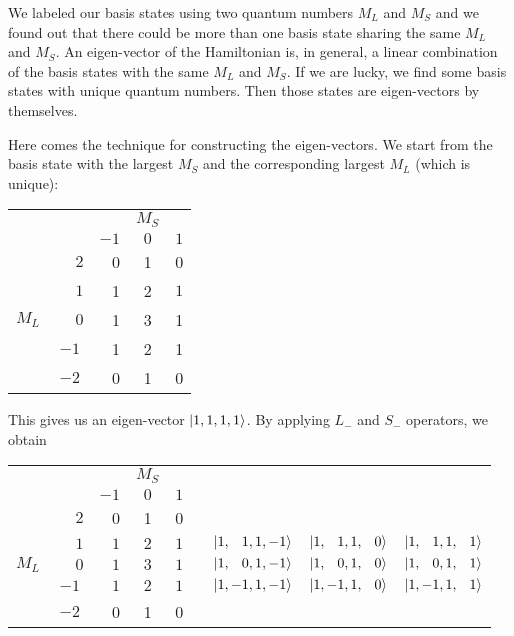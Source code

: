 We labeled our basis states using two quantum numbers $M_L$ and $M_S$ and we found out
that there could be more than one basis state sharing the same $M_L$ and $M_S$.
An eigen-vector of the Hamiltonian is, in general, a linear combination of the basis states
with the same $M_L$ and $M_S$. If we are lucky, we find some basis states with unique
quantum numbers. Then those states are eigen-vectors by themselves.

Here comes the technique for constructing the eigen-vectors.
We start from the basis state with the largest $M_S$ and the corresponding largest
$M_L$ (which is unique):
\begin{center}
\begin{tabular}{c c|r c c}
      &  &  & $M_S$ & \\
      &  & $-1$ & $0$ & $1$ \\ \hline
      & $\phantom{-}2$ & 0 & 1 & 0 \\
      & $\phantom{-}1$ & 1 & 2 & $\boxed{1}$ \\
$M_L$ & $\phantom{-}0$ & 1 & 3 & 1 \\
      & $-1$ & 1 & 2 & 1 \\
      & $-2$ & 0 & 1 & 0 \\
\end{tabular}
\end{center}

This gives us an eigen-vector $\Ket{1,1,1,1}$. By applying $L_-$ and $S_-$ operators,
we obtain 
\begin{center}
\begin{tabular}{c c|r c c r r r}
      &  &  & $M_S$ &  &  &  \\
      &  & $-1$ & $0$ & $1$ &  &  \\ \cline{1-5}
      & $\phantom{-}2$ & 0 & 1 & 0 &  &  &  \\
      & $\phantom{-}1$ & $\boxed{1}$ & $\boxed{2}$ & $\boxed{1}$ & $\quad\Ket{1,\phantom{-}1,1,-1}$ & $\Ket{1,\phantom{-}1,1,\phantom{-}0}$ & $\Ket{1,\phantom{-}1,1,\phantom{-}1}$ \\
$M_L$ & $\phantom{-}0$ & $\boxed{1}$ & $\boxed{3}$ & $\boxed{1}$ & $\quad\Ket{1,\phantom{-}0,1,-1}$ & $\Ket{1,\phantom{-}0,1,\phantom{-}0}$ & $\Ket{1,\phantom{-}0,1,\phantom{-}1}$ \\
      & $-1$ & $\boxed{1}$ & $\boxed{2}$ & $\boxed{1}$ & $\quad\Ket{1,-1,1,-1}$ & $\Ket{1,-1,1,\phantom{-}0}$ & $\Ket{1,-1,1,\phantom{-}1}$ \\
      & $-2$ & 0 & 1 & 0 &  &  &  \\
\end{tabular}
\end{center}

